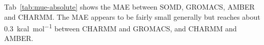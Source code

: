 \documentclass[journal=jctcce,manuscript=article]{achemso}
\begin{document}
Tab~\ref{tab:mue-absolute} shows the MAE between SOMD, GROMACS, AMBER and 
CHARMM.
The MAE appears to be fairly small generally but 
reaches about \SI{0.3}{kcal.mol^{-1}} between CHARMM and GROMACS, and CHARMM 
and AMBER.
\begin{table}[]
  \begin{minipage}{\linewidth}
    \caption{MAE (in \si{kcal.mol^{-1}}) comparing relative free energies from 
    absolute simulations between SOMD, GROMACS, AMBER and 
    CHARMM.}\label{tab:mue-absolute}
  \end{minipage}
\end{table}
\end{document}
